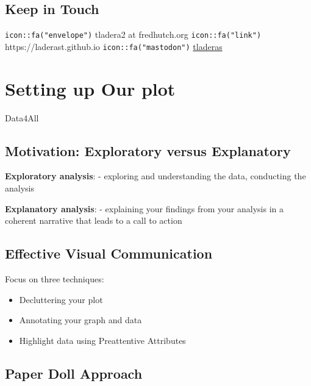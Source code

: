 \documentclass[
  letterpaper,
  DIV=11,
  numbers=noendperiod]{scrreprt}
\providecommand{\tightlist}{%
  \setlength{\itemsep}{0pt}\setlength{\parskip}{0pt}}\usepackage{longtable,booktabs,array}
\begin{document}
\section*{Keep in Touch}\label{keep-in-touch}


\texttt{icon::fa("envelope")} tladera2 at fredhutch.org
\texttt{icon::fa("link")} https://laderast.github.io
\texttt{icon::fa("mastodon")} \href{https://vmst.io/@tladeras}{tladeras}


\chapter{Setting up Our plot}\label{setting-up-our-plot}

Data4All

\hfill\break

\section{Motivation: Exploratory versus
Explanatory}\label{motivation-exploratory-versus-explanatory}

\textbf{Exploratory analysis}: - exploring and understanding the data,
conducting the analysis

\textbf{Explanatory analysis}: - explaining your findings from your
analysis in a coherent narrative that leads to a call to action

\section{Effective Visual
Communication}\label{effective-visual-communication}

Focus on three techniques:

\begin{itemize}
\tightlist
\item
  Decluttering your plot
\item
  Annotating your graph and data
\item
  Highlight data using Preattentive Attributes
\end{itemize}

\section{Paper Doll Approach}\label{paper-doll-approach}
\end{document}
